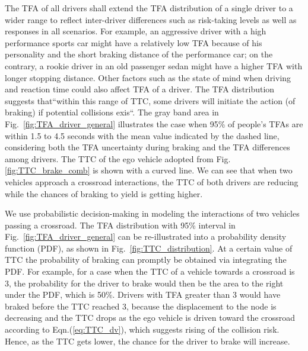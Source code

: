 The TFA of all drivers shall extend the TFA distribution of a single driver to a wider range to reflect inter-driver differences such as risk-taking levels as well as responses in all scenarios. For example, an aggressive driver with a high performance sports car might have a relatively low TFA because of his personality and the short braking distance of the performance car; on the contrary, a rookie driver in an old passenger sedan might have a higher TFA with longer stopping distance. Other factors such as the state of mind when driving and reaction time could also affect TFA of a driver. The TFA distribution suggests that``within this range of TTC, some drivers will initiate the action (of braking) if potential collisions exis``. The gray band area in Fig.~\ref{fig:TFA_driver_general} illustrates the case when 95\% of people's TFAs are within 1.5 to 4.5 seconds with the mean value indicated by the dashed line, considering both the TFA uncertainty during braking and the TFA differences among drivers. The TTC of the ego vehicle adopted from Fig.\ref{fig:TTC_brake_comb} is shown with a curved line. We can see that when two vehicles approach a crossroad interactions, the TTC of both drivers are reducing while the chances of braking to yield is getting higher. 

We use probabilistic decision-making in modeling the interactions of two vehicles passing a crossroad. The TFA distribution with 95\% interval in Fig.~\ref{fig:TFA_driver_general} can be re-illustrated into a probability density function (PDF), as shown in Fig.~\ref{fig:TTC_distribution}. At a certain value of TTC the probability of braking can promptly be obtained via integrating the PDF. For example, for a case when the TTC of a vehicle towards a crossroad is 3, the probability for the driver to brake would then be the area to the right under the PDF, which is 50\%. Drivers with TFA greater than 3 would have braked before the TTC reached 3, because the displacement to the node is decreasing and the TTC drops as the ego vehicle is driven toward the crossroad according to Eqn.(\ref{eq:TTC_dv}), which suggests rising of the collision risk. Hence, as the TTC gets lower, the chance for the driver to brake will increase.

